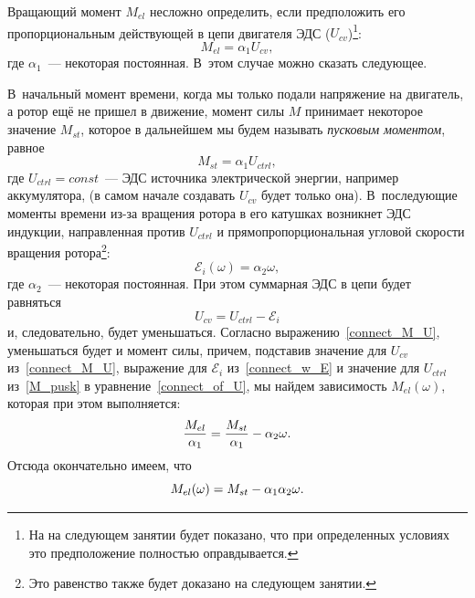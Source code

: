\documentclass[12pt,a4paper,openany]{extarticle}
\begin{document}
Вращающий момент $M_{el}$ несложно определить, если предположить его пропорциональным действующей в цепи двигателя ЭДС ($U_{cv}$)\footnote{На на следующем занятии будет показано, что при определенных условиях это предположение полностью оправдывается.}:
\begin{equation}\label{connect_M_U}
	M_{el} = \alpha_1U_{cv},
\end{equation}
где $\alpha_1$~--- некоторая постоянная.
В~этом случае можно сказать следующее.
  
В~начальный момент времени, когда мы только подали напряжение на двигатель, а ротор ещё не пришел в движение, момент силы $M$ принимает некоторое значение $M_{st}$, которое в дальнейшем мы будем называть {\itshape пусковым моментом}, равное 
\begin{equation}\label{M_pusk}
	M_{st}=\alpha_1U_{ctrl},
\end{equation}
где $U_{ctrl} = const$~--- ЭДС источника электрической энергии, например аккумулятора, (в самом начале создавать $U_{cv}$ будет только она).  
В~последующие моменты времени из-за вращения ротора в его катушках возникнет ЭДС индукции, направленная против $U_{ctrl}$ и прямопропорциональная угловой скорости вращения ротора\footnote{Это равенство также будет доказано на следующем занятии.}:
\begin{equation}\label{connect_w_E}
	\mathcal E_i(\omega)=\alpha_2\omega,
\end{equation}  
где $\alpha_2$~--- некоторая постоянная. 
При этом суммарная ЭДС в цепи будет равняться
\begin{equation}\label{connect_of_U}
	U_{cv}=U_{ctrl}-\mathcal E_i
\end{equation} 
и, следовательно, будет уменьшаться. 
Согласно выражению~\eqref{connect_M_U}, уменьшаться будет и момент силы, причем, подставив значение для $U_{cv}$ из~\eqref{connect_M_U}, выражение для $\mathcal E_i$ из~\eqref{connect_w_E} и значение для $U_{ctrl}$ из~\eqref{M_pusk} в уравнение~\eqref{connect_of_U}, мы найдем зависимость $M_{el}(\omega)$, которая при этом выполняется:
\begin{equation*}\label{bad_M(w)*}
	\frac{M_{el}}{\alpha_1}=\frac{M_{st}}{\alpha_1}-\alpha_2\omega\ldotp
\end{equation*}
Отсюда окончательно имеем, что
\begin{equation}\label{bad_M(w)}
	M_{el}(\omega)=M_{st}-\alpha_1\alpha_2\omega\ldotp
\end{equation}
\end{document}
